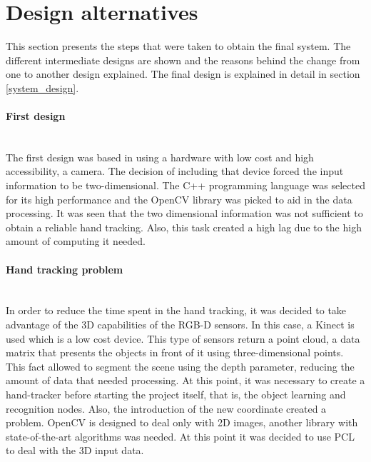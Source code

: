 \section{Design alternatives}
This section presents the steps that were taken to obtain the final system. 
The different intermediate designs are shown and the reasons behind the change from one to another design explained. 
The final design is explained in detail in section \ref{system_design}.
\\

\paragraph{First design}
\mbox{} \\

The first design was based in using a hardware with low cost and high accessibility, a camera. The decision of including that device forced the input information to be two-dimensional. The C++ programming language was selected for its high performance and the OpenCV library was picked to aid in the data processing. It was seen that the two dimensional information was not sufficient to obtain a reliable hand tracking. Also, this task created a high lag due to the high amount of computing it needed. 
\\


\paragraph{Hand tracking problem}
\mbox{} \\

In order to reduce the time spent in the hand tracking, it was decided to take advantage of the 3D capabilities of the RGB-D sensors. 
In this case, a Kinect is used which is a low cost device. 
This type of sensors return a point cloud, a data matrix that presents the objects in front of it using three-dimensional points. 
This fact allowed to segment the scene using the depth parameter, reducing the amount of data that needed processing. 
At this point, it was necessary to create a hand-tracker before starting the project itself, that is, the object learning and recognition nodes. 
Also, the introduction of the new coordinate created a problem. OpenCV is designed to deal only with 2D images, another library with state-of-the-art algorithms was needed. At this point it was decided to use PCL to deal with the 3D input data. 
\\


